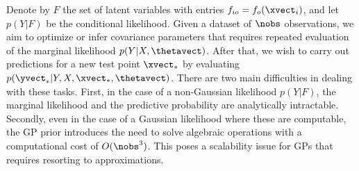 Denote by $F$ the set of latent variables with entries $f_{io} = f_o(\xvect_i)$, and let $p(Y | F)$ be the conditional likelihood.
Given a dataset of $\nobs$ observations, we aim to optimize or infer covariance parameters that requires repeated evaluation of the marginal likelihood $p(Y | X, \thetavect)$.
After that, we wish to carry out predictions for a new test point $\xvect_*$ by evaluating $p(\yvect_* | Y, X, \xvect_*, \thetavect)$.
There are two main difficulties in dealing with these tasks.
First, in the case of a non-Gaussian likelihood $p(Y | F)$, the marginal likelihood and the predictive probability are analytically intractable.
Secondly, even in the case of a Gaussian likelihood where these are computable, the GP prior introduces the need to solve algebraic operations 
  with a computational cost of $O(\nobs^3)$. This poses a scalability issue for GPs that requires resorting to approximations. %
%




